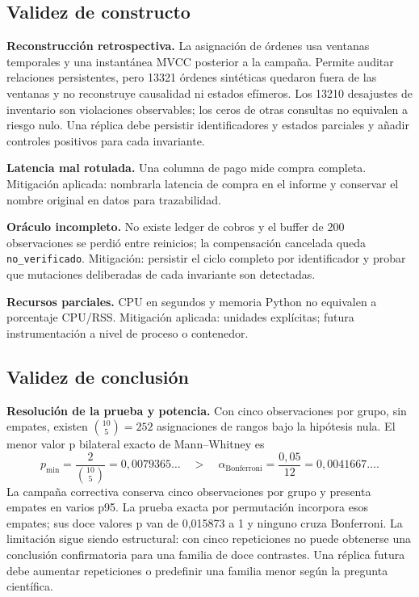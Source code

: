 \documentclass[12pt,a4paper]{article}
\begin{document}
\subsection{Validez de constructo}
\textbf{Reconstrucción retrospectiva.} La asignación de órdenes usa ventanas temporales y una instantánea MVCC posterior a la campaña. Permite auditar relaciones persistentes, pero 13321 órdenes sintéticas quedaron fuera de las ventanas y no reconstruye causalidad ni estados efímeros. Los 13210 desajustes de inventario son violaciones observables; los ceros de otras consultas no equivalen a riesgo nulo. Una réplica debe persistir identificadores y estados parciales y añadir controles positivos para cada invariante.

\textbf{Latencia mal rotulada.} Una columna de pago mide compra completa. Mitigación aplicada: nombrarla latencia de compra en el informe y conservar el nombre original en datos para trazabilidad.

\textbf{Oráculo incompleto.} No existe ledger de cobros y el buffer de 200 observaciones se perdió entre reinicios; la compensación cancelada queda \texttt{no\_verificado}. Mitigación: persistir el ciclo completo por identificador y probar que mutaciones deliberadas de cada invariante son detectadas.

\textbf{Recursos parciales.} CPU en segundos y memoria Python no equivalen a porcentaje CPU/RSS. Mitigación aplicada: unidades explícitas; futura instrumentación a nivel de proceso o contenedor.

\subsection{Validez de conclusión}
\textbf{Resolución de la prueba y potencia.} Con cinco observaciones por grupo, sin empates, existen \(\binom{10}{5}=252\) asignaciones de rangos bajo la hipótesis nula. El menor valor p bilateral exacto de Mann--Whitney es
\begin{equation}
p_{\min}=\frac{2}{\binom{10}{5}}=0{,}0079365\ldots
\quad > \quad
\alpha_{\mathrm{Bonferroni}}=\frac{0{,}05}{12}=0{,}0041667\ldots .
\label{eq:limite-mann-whitney}
\end{equation}
La campaña correctiva conserva cinco observaciones por grupo y presenta empates en varios p95. La prueba exacta por permutación incorpora esos empates; sus doce valores p van de 0,015873 a 1 y ninguno cruza Bonferroni. La limitación sigue siendo estructural: con cinco repeticiones no puede obtenerse una conclusión confirmatoria para una familia de doce contrastes. Una réplica futura debe aumentar repeticiones o predefinir una familia menor según la pregunta científica.
\end{document}
